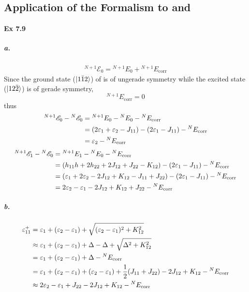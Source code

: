 \documentclass[a4paper]{article}
\DeclareMathOperator{\corr}{\mathrm{corr}}
\newcommand{\ex}[1]{\paragraph{Ex #1}}
\newcommand{\subex}[1]{\subparagraph{#1}}
\numberwithin{equation}{subsection}
\begin{document}
\subsection{Application of the Formalism to  and }
\ex{7.9}
\subex{a.}
\begin{align}
^{N+1}\mathscr{E}_0 = {^{N+1}E_0} + {^{N+1}E_{\corr}}
\end{align}
Since the ground state ($ \ket{1\bar{1}2} $) of  is of ungerade symmetry while the excited state ($ \ket{12\bar{2}} $) is of gerade symmetry, 
\begin{equation}\label{key}
{^{N+1}E_{\corr}} = 0
\end{equation}
thus
\begin{align}
^{N+1}\mathscr{E}_0 - {^N}\mathscr{E}_0 &= {^{N+1}E_0} - {^{N}E_0} - {^N}E_{\corr} \notag\\
&= (2\varepsilon_1 + \varepsilon_2 -J_{11}) - (2\varepsilon_1 - J_{11}) - {^N}E_{\corr} \notag\\
&= \varepsilon_2 - {^N}E_{\corr} 
\end{align}
\begin{align}
^{N+1}\mathscr{E}_1 - {^N}\mathscr{E}_0 &= {^{N+1}E_1} - {^{N}E_0} - {^N}E_{\corr} \notag\\
&= (h_{11} h + 2h_{22} + 2J_{12} + J_{22} - K_{12}) - (2\varepsilon_1 - J_{11}) - {^N}E_{\corr} \notag\\
&= (\varepsilon_1 + 2\varepsilon_2 - 2J_{12} + K_{12} - J_{11} + J_{22}) - (2\varepsilon_1 - J_{11}) - {^N}E_{\corr} \notag\\
&= 2\varepsilon_2 - \varepsilon_1 - 2J_{12} + K_{12} + J_{22} - {^N}E_{\corr}
\end{align}
\subex{b.}
\begin{align}
\varepsilon_{11}^+ %
&= \varepsilon_1 + (\varepsilon_2 - \varepsilon_1) + \sqrt{(\varepsilon_2 - \varepsilon_1)^2 + K_{12}^2} \notag\\
&\approx \varepsilon_1 + (\varepsilon_2 - \varepsilon_1) + \Delta - \Delta + \sqrt{\Delta^2 + K_{12}^2} \notag\\
&= \varepsilon_1 + (\varepsilon_2 - \varepsilon_1) + \Delta - {^N}E_{\corr} \notag\\
&= \varepsilon_1 + (\varepsilon_2 - \varepsilon_1) + (\varepsilon_2 - \varepsilon_1) + \dfrac{1}{2}(J_{11} + J_{22}) - 2J_{12} + K_{12} - {^N}E_{\corr} \notag\\
&\approx 2\varepsilon_2 - \varepsilon_1 + J_{22} - 2J_{12} + K_{12} - {^N}E_{\corr}
\end{align}
\end{document}
